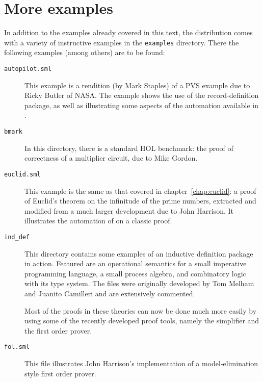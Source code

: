 
\chapter{More examples}
\label{chap:more-examples}

In addition to the examples already covered in this text, the \holn{}
distribution comes with a variety of instructive examples in the
\verb|examples| directory.  There the following examples (among
others) are to be found:

\begin{description}

\item [\tt autopilot.sml]

  This example is a \holn{} rendition (by Mark Staples) of a PVS
  example due to Ricky Butler of NASA. The example shows the use of
  the record-definition package, as well as illustrating some aspects
  of the automation available in \holn{}.

\item [\tt bmark]

  In this directory, there is a standard HOL benchmark: the proof of
  correctness of a multiplier circuit, due to Mike Gordon.

\item [\tt euclid.sml]

  This example is the same as that covered in
  chapter~\ref{chap:euclid}: a proof of Euclid's theorem on the
  infinitude of the prime numbers, extracted and modified from a much
  larger development due to John Harrison. It illustrates the
  automation of \HOL{} on a classic proof.

\item[\tt ind\_def]

This directory contains some examples of an inductive definition package
in action. Featured are an operational semantics for a small imperative
programming language, a small process algebra, and combinatory logic
with its type system. The files were originally developed by Tom Melham
and Juanito Camilleri and are extensively commented.

Most of the proofs in these theories can now be done much more easily by
using some of the recently developed proof tools, namely the simplifier
and the first order prover.

\item [\tt fol.sml]

  This file illustrates John Harrison's implementation of a
  model-elimination style first order prover.


\end{description}
